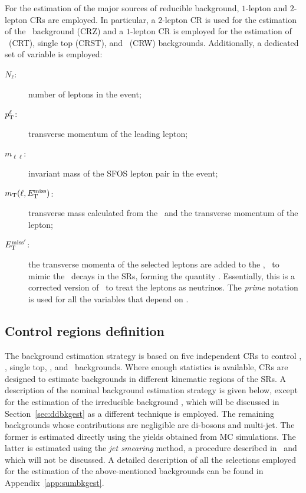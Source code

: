 		For the estimation of the major sources of reducible background, $1$-lepton and $2$-lepton \acp{CR} are employed. In particular, a $2$-lepton \ac{CR} is used for the estimation of the \Zjets\ background (CRZ) and a $1$-lepton \ac{CR} is employed for the estimation of \ttbar\ (CRT), single top (CRST), and \Wjets\ (CRW) backgrounds. Additionally, a dedicated set of variable is employed:

		\begin{description}
			\item[\boldmath $N_{\ell}$:] number of leptons in the event;
			\item[\boldmath $p_{\mathrm{T}}^{\ell}$:] transverse momentum of the leading lepton;
			\item[\boldmath $m_{\ell\ell}$:] invariant mass of the \ac{SFOS} lepton pair in the event;
			\item[\boldmath $m_{\mathrm{T}}(\ell,E_{\mathrm{T}}^{\mathrm{miss}})$:] transverse mass calculated from the \met\ and the transverse momentum of the lepton;  
			\item[\boldmath $E_{\mathrm{T}}^{\mathrm{miss'}}$:] the transverse momenta of the selected leptons are added to the \ptmiss, \eg\ to mimic the \Znunu\ decays in the \acp{SR}, forming the quantity \metprime. Essentially, this is a corrected version of \met\ to treat the leptons as neutrinos. The \emph{prime} notation is used for all the variables that depend on \metprime.
		\end{description}


		\subsection{Control regions definition}
		\label{subsec:crs}

			The background estimation strategy is based on five independent \acp{CR} to control \Zjets, \ttbar, single top, \Wjets, and \ttZ\ backgrounds. Where enough statistics is available, \acp{CR} are designed to estimate backgrounds in different kinematic regions of the \acp{SR}. A description of the nominal background estimation strategy is given below, except for the estimation of the irreducible background \ttZ, which will be discussed in Section~\ref{sec:ddbkgest} as a different technique is employed. The remaining backgrounds whose contributions are negligible are di-bosons and multi-jet. The former is estimated directly using the yields obtained from \ac{MC} simulations. The latter is estimated using the \emph{jet smearing} method, a procedure described in~\cite{Aad:2012fqa} and~\cite{calumThesis} which will not be discussed. A detailed description of all the selections employed for the estimation of the above-mentioned backgrounds can be found in Appendix~\ref{app:sumbkgest}. 

